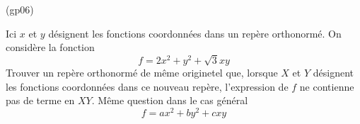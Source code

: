 \begin{tiny}(gp06)\end{tiny}
Ici $x$ et $y$ d{\'e}signent les fonctions coordonn{\'e}es dans un rep{\`e}re orthonorm{\'e}. On consid{\`e}re la fonction
\[f=2x^2+y^2+\sqrt{3}xy\]
Trouver un rep{\`e}re orthonorm{\'e} de même originetel que, lorsque $X$ et $Y$ d{\'e}signent les fonctions coordonn{\'e}es dans ce nouveau rep{\`e}re, l'expression de $f$ ne contienne pas de terme en $XY$.
M{\^e}me question dans le cas g{\'e}n{\'e}ral
\[f=ax^2+by^2+cxy\]
